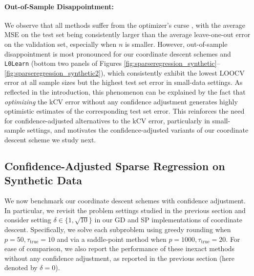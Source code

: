 \documentclass[mnsc,nonblindrev]{informs3} %
\begin{document}
\paragraph{Out-of-Sample Disappointment: } We observe that all methods suffer from the optimizer's curse \citep[cf.][]{smith2006optimizer, van2021data}, with the average MSE on the test set being consistently larger than the average leave-one-out error on the validation set, especially when $n$ is smaller. However, out-of-sample disappointment is most pronounced for our coordinate descent schemes and \verb|L0Learn| (bottom two panels of Figures \ref{fig:sparseregression_synthetic}--\ref{fig:sparseregression_synthetic2}), which consistently exhibit the lowest LOOCV error at all sample sizes but the highest test set error in small-data settings. As reflected in the introduction, this phenomenon can be explained by the fact that \textit{optimizing} the kCV error without any confidence adjustment generates highly optimistic estimates of the corresponding test set error. This reinforces the need for confidence-adjusted alternatives to the kCV error, particularly in small-sample settings, and motivates the confidence-adjusted variants of our coordinate descent scheme we study next.



\subsection{Confidence-Adjusted Sparse Regression on Synthetic Data}\label{sec:syntStats2}
We now benchmark our coordinate descent schemes with confidence adjustment. In particular, we revisit the problem settings studied in the previous section and consider setting $\delta \in \{1, \sqrt{10}\}$ in our GD and SP implementations of coordinate descent. Specifically, we solve each subproblem using greedy rounding when $p=50, \tau_{\text{true}}=10$ and via a saddle-point method when $p=1000, \tau_{\text{true}}=20$. For ease of comparison, we also report the performance of these inexact methods without any confidence adjustment, as reported in the previous section {\color{black}(here denoted by $\delta =0$)}.
\end{document}
